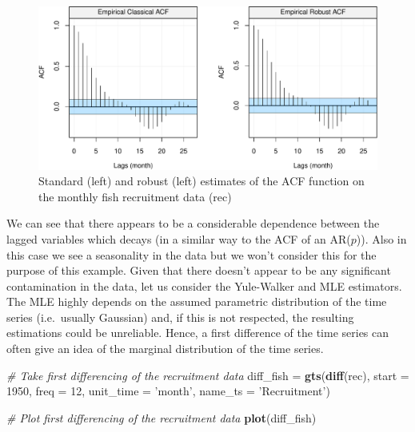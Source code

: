 \documentclass[]{book}
\newenvironment{Shaded}{\begin{snugshade}}{\end{snugshade}}
\newcommand{\CommentTok}[1]{\textcolor[rgb]{0.56,0.35,0.01}{\textit{#1}}}
\newcommand{\DataTypeTok}[1]{\textcolor[rgb]{0.13,0.29,0.53}{#1}}
\newcommand{\DecValTok}[1]{\textcolor[rgb]{0.00,0.00,0.81}{#1}}
\newcommand{\KeywordTok}[1]{\textcolor[rgb]{0.13,0.29,0.53}{\textbf{#1}}}
\newcommand{\NormalTok}[1]{#1}
\newcommand{\StringTok}[1]{\textcolor[rgb]{0.31,0.60,0.02}{#1}}
\theoremstyle{definition}
\theoremstyle{definition}
\theoremstyle{definition}
\theoremstyle{remark}
\begin{document}
\begin{figure}

{\centering \includegraphics{ts_files/figure-latex/unnamed-chunk-36-1} 

}

\caption{Standard (left) and robust (left) estimates of the ACF function on the monthly fish recruitment data (rec)}\label{fig:unnamed-chunk-36}
\end{figure}

We can see that there appears to be a considerable dependence between
the lagged variables which decays (in a similar way to the ACF of an
AR(\(p\))). Also in this case we see a seasonality in the data but we
won't consider this for the purpose of this example. Given that there
doesn't appear to be any significant contamination in the data, let us
consider the Yule-Walker and MLE estimators. The MLE highly depends on
the assumed parametric distribution of the time series (i.e.~usually
Gaussian) and, if this is not respected, the resulting estimations could
be unreliable. Hence, a first difference of the time series can often
give an idea of the marginal distribution of the time series.

\begin{Shaded}
\begin{Highlighting}[]
\CommentTok{# Take first differencing of the recruitment data}
\NormalTok{diff_fish =}\StringTok{ }\KeywordTok{gts}\NormalTok{(}\KeywordTok{diff}\NormalTok{(rec), }\DataTypeTok{start =} \DecValTok{1950}\NormalTok{, }\DataTypeTok{freq =} \DecValTok{12}\NormalTok{, }\DataTypeTok{unit_time =} \StringTok{'month'}\NormalTok{, }\DataTypeTok{name_ts =} \StringTok{'Recruitment'}\NormalTok{)}

\CommentTok{# Plot first differencing of the recruitment data}
\KeywordTok{plot}\NormalTok{(diff_fish)}
\end{Highlighting}
\end{Shaded}
\end{document}

